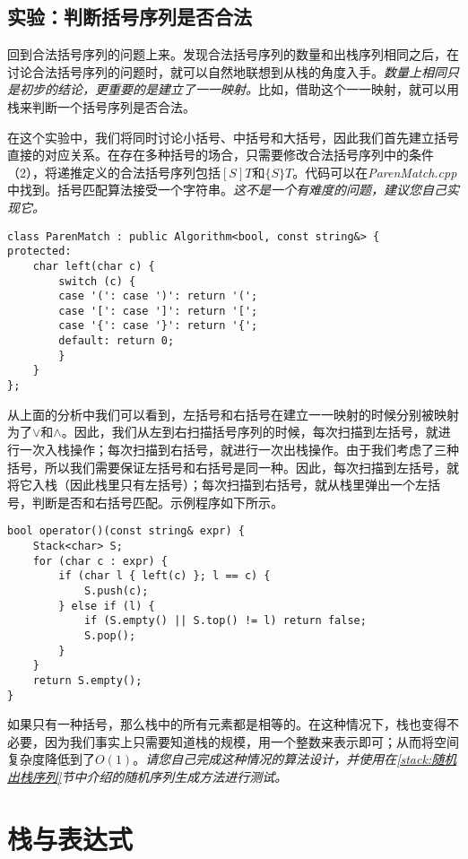 \subsection{实验：判断括号序列是否合法}

回到合法括号序列的问题上来。发现合法括号序列的数量和出栈序列相同之后，在讨论合法括号序列的问题时，就可以自然地联想到从栈的角度入手。\textit{数量上相同只是初步的结论，更重要的是建立了一一映射。}比如，借助这个一一映射，就可以用栈来判断一个括号序列是否合法。

在这个实验中，我们将同时讨论小括号、中括号和大括号，因此我们首先建立括号直接的对应关系。在存在多种括号的场合，只需要修改合法括号序列中的条件（2），将递推定义的合法括号序列包括$[S]T$和$\{S\}T$。代码可以在\textit{ParenMatch.cpp}中找到。括号匹配算法接受一个字符串。\textit{这不是一个有难度的问题，建议您自己实现它。}

\begin{lstlisting}
class ParenMatch : public Algorithm<bool, const string&> {
protected:
    char left(char c) {
        switch (c) {
        case '(': case ')': return '(';
        case '[': case ']': return '[';
        case '{': case '}': return '{';
        default: return 0;
        }
    }
};
\end{lstlisting}

从上面的分析中我们可以看到，左括号和右括号在建立一一映射的时候分别被映射为了$\lor$和$\land$。因此，我们从左到右扫描括号序列的时候，每次扫描到左括号，就进行一次入栈操作；每次扫描到右括号，就进行一次出栈操作。由于我们考虑了三种括号，所以我们需要保证左括号和右括号是同一种。因此，每次扫描到左括号，就将它入栈（因此栈里只有左括号）；每次扫描到右括号，就从栈里弹出一个左括号，判断是否和右括号匹配。示例程序如下所示。

\begin{lstlisting}
bool operator()(const string& expr) {
    Stack<char> S;
    for (char c : expr) {
        if (char l { left(c) }; l == c) {
            S.push(c);
        } else if (l) {
            if (S.empty() || S.top() != l) return false;
            S.pop();
        }
    }
    return S.empty();
}
\end{lstlisting}

如果只有一种括号，那么栈中的所有元素都是相等的。在这种情况下，栈也变得不必要，因为我们事实上只需要知道栈的规模，用一个整数来表示即可；从而将空间复杂度降低到了$O(1)$。\textit{请您自己完成这种情况的算法设计，并使用在\ref{stack:随机出栈序列}节中介绍的随机序列生成方法进行测试。}

\section{栈与表达式}
